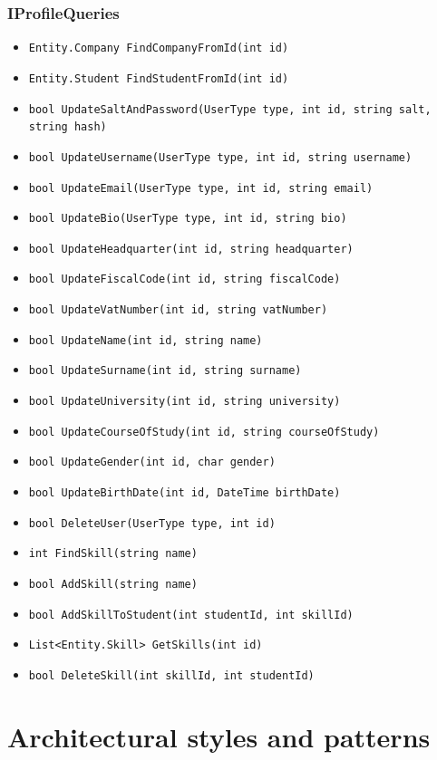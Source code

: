 \subsubsection{IProfileQueries}
\begin{itemize}
    \item \verb|Entity.Company FindCompanyFromId(int id)|
    \item \verb|Entity.Student FindStudentFromId(int id)|
    \item \verb|bool UpdateSaltAndPassword(UserType type, int id, string salt, string hash)|
    \item \verb|bool UpdateUsername(UserType type, int id, string username)|
    \item \verb|bool UpdateEmail(UserType type, int id, string email)|
    \item \verb|bool UpdateBio(UserType type, int id, string bio)|
    \item \verb|bool UpdateHeadquarter(int id, string headquarter)|
    \item \verb|bool UpdateFiscalCode(int id, string fiscalCode)|
    \item \verb|bool UpdateVatNumber(int id, string vatNumber)|
    \item \verb|bool UpdateName(int id, string name)|
    \item \verb|bool UpdateSurname(int id, string surname)|
    \item \verb|bool UpdateUniversity(int id, string university)|
    \item \verb|bool UpdateCourseOfStudy(int id, string courseOfStudy)|
    \item \verb|bool UpdateGender(int id, char gender)|
    \item \verb|bool UpdateBirthDate(int id, DateTime birthDate)|
    \item \verb|bool DeleteUser(UserType type, int id)|
    \item \verb|int FindSkill(string name)|
    \item \verb|bool AddSkill(string name)|
    \item \verb|bool AddSkillToStudent(int studentId, int skillId)|
    \item \verb|List<Entity.Skill> GetSkills(int id)|
    \item \verb|bool DeleteSkill(int skillId, int studentId)|
\end{itemize}

\section{Architectural styles and patterns}

